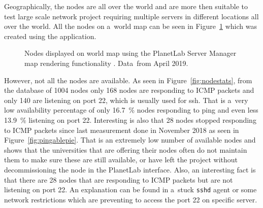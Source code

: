 {{{{{{{Geographically, the nodes are all over the world and are more then suitable to test large scale network project requiring multiple servers in different locations all over the world. All the nodes on a~world map can be seen in Figure~\ref{fig:allnodes} which was created using the application.

\begin{figure}[H]
	\centering
	\caption{Nodes displayed on world map using the PlanetLab Server Manager map rendering functionality \cite{OpenStreetMap}. Data~from April 2019.}
	\label{fig:allnodes}
\end{figure}

However, not all the nodes are available. As seen in Figure~\ref{fig:nodestats}, from the database of 1004 nodes only 168 nodes are responding to ICMP packets and only 140 are listening on port 22, which is usually used for ssh. That is a~very low availability percentage of only \SI{16.7}{\percent} nodes responding to ping and even less \SI{13.9}{\percent} listening on port 22. Interesting is also that 28 nodes stopped responding to ICMP packets since last measurement done in November 2018 as seen in Figure~\ref{fig:pingablepie}. That is an extremely low number of available nodes and shows that the universities that are offering their nodes often do not maintain them to make sure these are still available, or have left the project without decommissioning the node in the PlanetLab interface. Also, an interesting fact is that there are 28 nodes that are responding to ICMP packets but are not listening on port 22. An explanation can be found in a~stuck \texttt{sshd} agent or some network restrictions which are preventing to access the port 22 on specific server.

}}}}}}}
